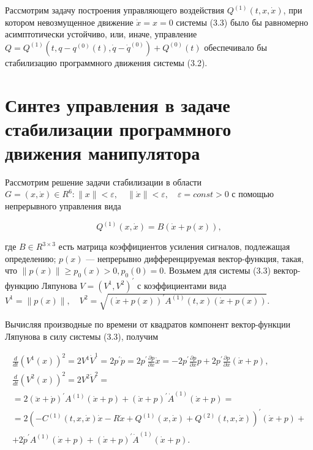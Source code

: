 Рассмотрим задачу построения управляющего воздействия $Q^{(1)}(t, x, \dot x)$, при котором невозмущенное движение $\dot x = x = 0$ системы (3.3) было бы равномерно асимптотически устойчиво, или, иначе, управление $Q = Q^{(1)}(t, q-q^{(0)}(t), \dot q - \dot q^{(0)}) + Q^{(0)}(t)$ обеспечивало бы стабилизацию программного движения   системы (3.2).
 
  \section{Синтез управления в задаче стабилизации программного движения манипулятора}%
 Рассмотрим решение задачи стабилизации в области $G = {(x, \dot x) \in R^6 : \|x\| < \varepsilon, \quad \|\dot x \| < \varepsilon, \quad \varepsilon = const>0}$
 с помощью непрерывного управления вида
 
 \begin{equation*}
  Q^{(1)} (x, \dot x) = B(\dot x + p(x)),
 \end{equation*}
 
 где $B \in R^{3 \times 3}$ есть матрица коэффициентов усиления сигналов, подлежащая определению; $p(x)$ --- непрерывно дифференцируемая вектор-функция, такая, что $\| p(x) \| \ge p_0(x) > 0, p_0(0) = 0$.
 Возьмем для системы (3.3) вектор-функцию Ляпунова $V = (V^1, V^2)^{'}$ с коэффициентами вида $V^1 = \|p(x)\|, \quad V^2 = \sqrt{(\dot x + p(x))^{'} A^{(1)} (t, x) (\dot x + p(x))}$.
 
 Вычисляя производные по времени от квадратов компонент вектор-функции Ляпунова  в силу системы (3.3), получим 
 
 \begin{equation*}
 \begin{array}{c}
 \displaystyle \frac{d}{dt} (V^1(x))^2 = 2 V^1 \dot V^1 = 2 p^{'} \dot p = 2 p^{'} \frac{\partial p }{\partial x} \dot x = -2 p^{'} \frac{\partial p }{\partial x} p + 2 p^{'} \frac{\partial p }{\partial x}(\dot x + p),\\
    \displaystyle \frac{d}{dt} (V^2(x))^2 = 2 V^2 \dot V^2 =\\
   \displaystyle = 2(\ddot x + \dot p)^{'} A^{(1)} (\dot x + p) + (\dot x + p)^{'} \dot A^{(1)} (\dot x + p) =\\
   \displaystyle = 2(- C^{(1)}(t, x, \dot x) \dot x - R \dot x + Q^{(1)}(x, \dot x) + Q^{(2)}(t, x, \dot x))^{'} (\dot x + p) +\\
   \displaystyle + 2 \dot p^{'} A^{(1)} (\dot x + p) + (\dot x + p)^{'} \dot A^{(1)} (\dot x + p).
 \end{array}
 \end{equation*}
 
